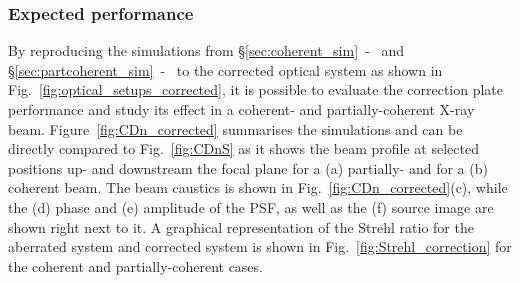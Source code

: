 \begin{refsection}
\begin{table}[h]
    \caption[Strehl ratio for L01-L10 and for the corrected system]{Comparison of the Strehl ratio for aberrated system composed of L01-L10 and the corrected system as shown in Fig.~\ref{fig:Strehl_correction}.}\label{tab:Strehl_corrected}%
\end{table}{}

\subsubsection*{Expected performance}

By reproducing the simulations from \S\ref{sec:coherent_sim}~-~\textit{} and \S\ref{sec:partcoherent_sim}~-~\textit{} to the corrected optical system as shown in Fig.~\ref{fig:optical_setups_corrected}, it is possible to evaluate the correction plate performance and study its effect in a coherent- and partially-coherent X-ray beam. Figure~\ref{fig:CDn_corrected} summarises the simulations and can be directly compared to Fig.~\ref{fig:CDnS} as it
shows the beam profile at selected positions up- and downstream the focal plane for a (a) partially- and for a (b) coherent beam. The beam caustics is shown in Fig.~\ref{fig:CDn_corrected}(c), while the (d) phase and (e) amplitude of the PSF, as well as the (f) source image are shown right next to it. A graphical representation of the Strehl ratio for the aberrated system and corrected system is shown in Fig.~\ref{fig:Strehl_correction} for the coherent and partially-coherent cases.


\end{refsection}
